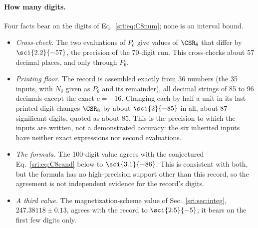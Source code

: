 \paragraph{How many digits.} Four facts bear on the digits of Eq.~\eqref{sri:eq:C8num}; none is an interval bound.
\begin{itemize}
\item \emph{Cross-check.} The two evaluations of $P_6$ give values of $\CSR_8$ that differ by $\sci{2.2}{-57}$, the
 precision of the 70-digit run. This cross-checks about 57 decimal places, and only through $P_6$.
\item \emph{Printing floor.} The record is assembled exactly from 36 numbers (the 35 inputs, with $N_\delta$ given as
 $P_6$ and its remainder), all decimal strings of 85 to 96 decimals except the exact $c=-16$. Changing each by half a
 unit in its last printed digit changes $\CSR_8$ by about $\sci{2}{-85}$ in all, about 87 significant digits, quoted
 as about 85. This is the precision to which the inputs are written, not a demonstrated accuracy: the six inherited
 inputs have neither exact expressions nor second evaluations.
\item \emph{The formula.} The 100-digit value agrees with the conjectured Eq.~\eqref{sri:eq:C8cand} below to
 $\sci{3.1}{-86}$. This is consistent with both, but the formula has no high-precision support other than this record,
 so the agreement is not independent evidence for the record's digits.
\item \emph{A third value.} The magnetization-scheme value of Sec.~\ref{sri:sec:integ}, $247.38118\pm0.13$, agrees with the
 record to $\sci{2.5}{-5}$; it bears on the first few digits only.
\end{itemize}


